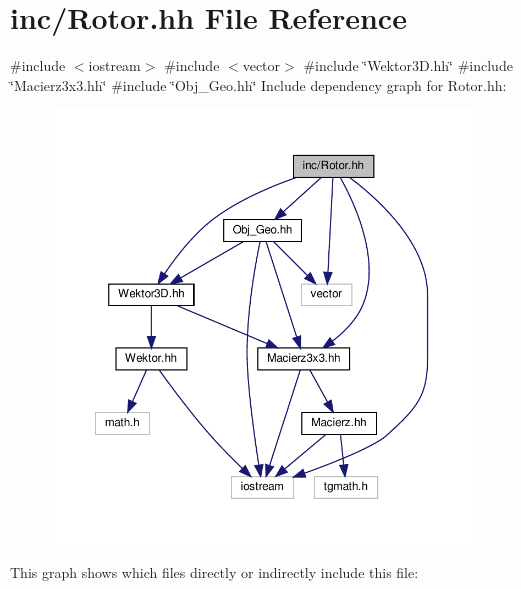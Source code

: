 \hypertarget{_rotor_8hh}{}\section{inc/\+Rotor.hh File Reference}
\label{_rotor_8hh}
{\ttfamily \#include $<$iostream$>$}\newline
{\ttfamily \#include $<$vector$>$}\newline
{\ttfamily \#include \char`\"{}Wektor3\+D.\+hh\char`\"{}}\newline
{\ttfamily \#include \char`\"{}Macierz3x3.\+hh\char`\"{}}\newline
{\ttfamily \#include \char`\"{}Obj\+\_\+\+Geo.\+hh\char`\"{}}\newline
Include dependency graph for Rotor.\+hh\+:
\nopagebreak
\begin{figure}[H]
\begin{center}
\leavevmode
\includegraphics[width=350pt]{_rotor_8hh__incl}
\end{center}
\end{figure}
This graph shows which files directly or indirectly include this file\+:
\nopagebreak
